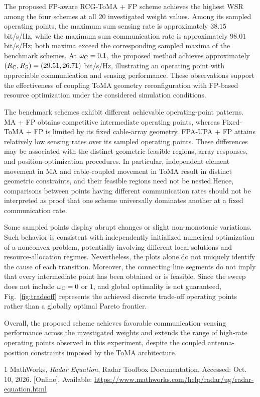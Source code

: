 \documentclass[letterpaper,journal]{IEEEtran}
\begin{document}
The proposed FP-aware RCG-ToMA + FP scheme achieves the highest WSR
among the four schemes at all 20 investigated weight values. Among its
sampled operating points, the maximum sum sensing rate is approximately
$38.15$ bit/s/Hz, while the maximum sum communication rate is
approximately $98.01$ bit/s/Hz; both maxima exceed the corresponding
sampled maxima of the benchmark schemes. At $\omega_{\rm C}=0.1$, the
proposed method achieves approximately
$(R_{\rm C},R_{\rm S})=(29.51,26.71)$ bit/s/Hz, illustrating an
operating point with appreciable communication and sensing performance.
These observations support the effectiveness of coupling ToMA geometry
reconfiguration with FP-based resource optimization under the
considered simulation conditions.

The benchmark schemes exhibit different achievable operating-point
patterns. MA + FP obtains competitive intermediate operating points,
whereas Fixed-ToMA + FP is limited by its fixed cable-array geometry.
FPA-UPA + FP attains relatively low sensing rates over its sampled
operating points. These differences may be associated with the distinct
geometric feasible regions, array responses, and position-optimization
procedures. In particular, independent element movement in MA and cable-coupled
movement in ToMA result in distinct geometric constraints, and their
feasible regions need not be nested.Hence, comparisons between
points having different communication rates should not be interpreted
as proof that one scheme universally dominates another at a fixed
communication rate.

Some sampled points display abrupt changes or slight non-monotonic
variations. Such behavior is consistent with independently initialized
numerical optimization of a nonconvex problem, potentially involving
different local solutions and resource-allocation regimes. Nevertheless,
the plots alone do not uniquely identify the cause of each transition.
Moreover, the connecting line segments do not imply that every
intermediate point has been obtained or is feasible. Since the sweep
does not include $\omega_{\rm C}=0$ or $1$, and global optimality is not
guaranteed, Fig.~\ref{fig:tradeoff} represents the achieved discrete
trade-off operating points rather than a globally optimal Pareto
frontier.

Overall, the proposed scheme achieves favorable communication--sensing
performance across the investigated weights and extends the range of
high-rate operating points observed in this experiment, despite the
coupled antenna-position constraints imposed by the ToMA architecture.

% 
% 

\begin{thebibliography}{1}
MathWorks, \emph{Radar Equation}, Radar Toolbox Documentation.
Accessed: Oct. 10, 2026. [Online]. Available:
\url{https://www.mathworks.com/help/radar/ug/radar-equation.html}
\end{thebibliography}
\end{document}
